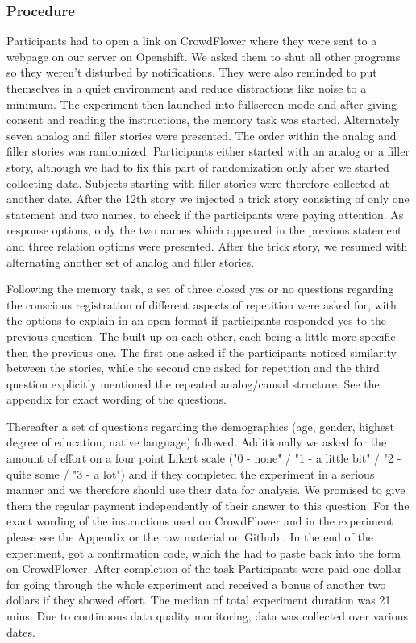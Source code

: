 \documentclass[a4paper,man,natbib,floatsintext,import]{apa6}
\begin{document}
\subsubsection{Procedure}
Participants had to open a link on CrowdFlower where they were sent to a webpage on our server on Openshift. We asked them to shut all other programs so they weren't disturbed by notifications. They were also reminded to put themselves in a quiet environment and reduce distractions like noise to a minimum. The experiment then launched into fullscreen mode and after giving consent and reading the instructions, the memory task was started. Alternately seven analog and filler stories were presented. The order within the analog and filler stories was randomized. Participants either started with an analog or a filler story, although we had to fix this part of randomization only after we started collecting data. Subjects starting with filler stories were therefore collected at another date. After the 12th story we injected a trick story consisting of only one statement and two names, to check if the participants were paying attention. As response options, only the two names which appeared in the previous statement and three relation options were presented. After the trick story, we resumed with alternating another set of analog and filler stories.

Following the memory task, a set of three closed yes or no questions regarding the conscious registration of different aspects of repetition were asked for, with the options to explain in an open format if participants responded yes to the previous question. The built up on each other, each being a little more specific then the previous one. The first one asked if the participants noticed similarity between the stories, while the second one asked for repetition and the third question explicitly mentioned the repeated analog/causal structure. See the appendix for exact wording of the questions.

Thereafter a set of questions regarding the demographics (age, gender, highest degree of education, native language) followed. Additionally we asked for the amount of effort on a four point Likert scale ("0 - none" / "1 - a little bit" / "2 - quite some / "3 - a lot") and if they completed the experiment in a serious manner and we therefore should use their data for analysis. We promised to give them the regular payment independently of their answer to this question. For the exact wording of the instructions used on CrowdFlower and in the experiment please see the Appendix or the raw material on Github \citep{Oesch2016}. In the end of the experiment, got a confirmation code, which the had to paste back into the form on CrowdFlower. After completion of the task Participants were paid one dollar for going through the whole experiment and received a bonus of another two dollars if they showed effort. The median of total experiment duration was 21 mins.
Due to continuous data quality monitoring, data was collected over various dates.
\end{document}
